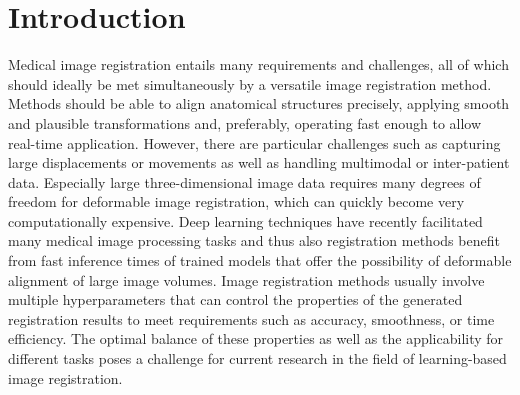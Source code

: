 
\section{Introduction}
\label{sec:introduction}
Medical image registration entails many requirements and challenges, all of which should ideally be met simultaneously by a versatile image registration method. Methods should be able to align anatomical structures precisely, applying smooth and plausible transformations and, preferably, operating fast enough to allow real-time application. However, there are particular challenges such as capturing large displacements or movements as well as handling multimodal or inter-patient data. Especially large three-dimensional image data requires many degrees of freedom for deformable image registration, which can quickly become very computationally expensive. Deep learning techniques have recently facilitated many medical image processing tasks and thus also registration methods benefit from fast inference times of trained models that offer the possibility of deformable alignment of large image volumes. Image registration methods usually involve multiple hyperparameters that can control the properties of the generated registration results to meet requirements such as accuracy, smoothness, or time efficiency. The optimal balance of these properties as well as the applicability for different tasks poses a challenge for current research in the field of learning-based image registration.

